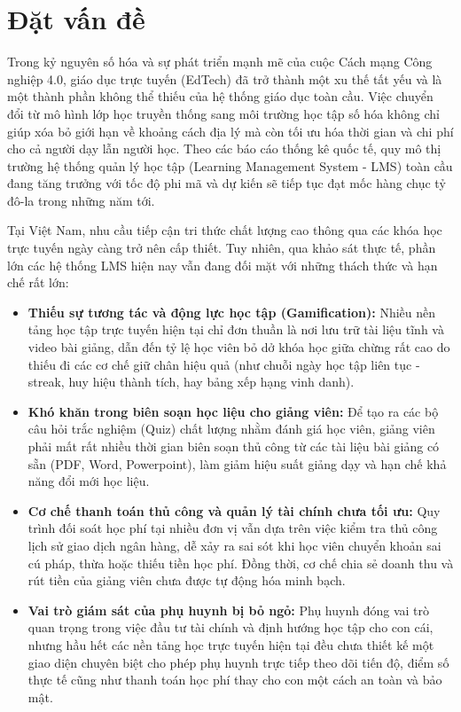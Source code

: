 \documentclass[../main.tex]{subfiles}
\begin{document}
\section{Đặt vấn đề}
\label{sec:DatVanDe}

Trong kỷ nguyên số hóa và sự phát triển mạnh mẽ của cuộc Cách mạng Công nghiệp 4.0, giáo dục trực tuyến (EdTech) đã trở thành một xu thế tất yếu và là một thành phần không thể thiếu của hệ thống giáo dục toàn cầu. Việc chuyển đổi từ mô hình lớp học truyền thống sang môi trường học tập số hóa không chỉ giúp xóa bỏ giới hạn về khoảng cách địa lý mà còn tối ưu hóa thời gian và chi phí cho cả người dạy lẫn người học. Theo các báo cáo thống kê quốc tế, quy mô thị trường hệ thống quản lý học tập (Learning Management System - LMS) toàn cầu đang tăng trưởng với tốc độ phi mã và dự kiến sẽ tiếp tục đạt mốc hàng chục tỷ đô-la trong những năm tới.

Tại Việt Nam, nhu cầu tiếp cận tri thức chất lượng cao thông qua các khóa học trực tuyến ngày càng trở nên cấp thiết. Tuy nhiên, qua khảo sát thực tế, phần lớn các hệ thống LMS hiện nay vẫn đang đối mặt với những thách thức và hạn chế rất lớn:
\begin{itemize}
    \item \textbf{Thiếu sự tương tác và động lực học tập (Gamification):} Nhiều nền tảng học tập trực tuyến hiện tại chỉ đơn thuần là nơi lưu trữ tài liệu tĩnh và video bài giảng, dẫn đến tỷ lệ học viên bỏ dở khóa học giữa chừng rất cao do thiếu đi các cơ chế giữ chân hiệu quả (như chuỗi ngày học tập liên tục - streak, huy hiệu thành tích, hay bảng xếp hạng vinh danh).
    \item \textbf{Khó khăn trong biên soạn học liệu cho giảng viên:} Để tạo ra các bộ câu hỏi trắc nghiệm (Quiz) chất lượng nhằm đánh giá học viên, giảng viên phải mất rất nhiều thời gian biên soạn thủ công từ các tài liệu bài giảng có sẵn (PDF, Word, Powerpoint), làm giảm hiệu suất giảng dạy và hạn chế khả năng đổi mới học liệu.
    \item \textbf{Cơ chế thanh toán thủ công và quản lý tài chính chưa tối ưu:} Quy trình đối soát học phí tại nhiều đơn vị vẫn dựa trên việc kiểm tra thủ công lịch sử giao dịch ngân hàng, dễ xảy ra sai sót khi học viên chuyển khoản sai cú pháp, thừa hoặc thiếu tiền học phí. Đồng thời, cơ chế chia sẻ doanh thu và rút tiền của giảng viên chưa được tự động hóa minh bạch.
    \item \textbf{Vai trò giám sát của phụ huynh bị bỏ ngỏ:} Phụ huynh đóng vai trò quan trọng trong việc đầu tư tài chính và định hướng học tập cho con cái, nhưng hầu hết các nền tảng học trực tuyến hiện tại đều chưa thiết kế một giao diện chuyên biệt cho phép phụ huynh trực tiếp theo dõi tiến độ, điểm số thực tế cũng như thanh toán học phí thay cho con một cách an toàn và bảo mật.
\end{itemize}
\end{document}
